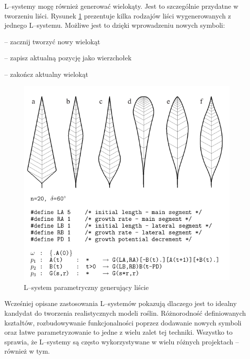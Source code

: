 \documentclass[inz,longabstract]{iithesis}
\begin{document}
        L--systemy mogę również generować wielokąty. Jest to szczególnie przydatne w tworzeniu liści. Rysunek \ref{fig:lsystemLeafs} prezentuje kilka rodzajów liści wygenerowanych z jednego L--systemu. Możliwe jest to dzięki wprowadzeniu nowych symboli:
        \begin{description}[itemsep=2pt, parsep=2pt, topsep=2pt, partopsep=2pt]
            \item[\text{\{}] -- zacznij tworzyć nowy wielokąt 
            \item[.] -- zapisz aktualną pozycję jako wierzchołek
            \item[\text{\}}] -- zakończ aktualny wielokąt
        \end{description}
        \begin{figure}[H]
            \includegraphics[width=\linewidth]{lsystemLeafs.png}
            \caption{L--system parametryczny generujący liście \cite{plants}} 
            \label{fig:lsystemLeafs}
        \end{figure}
        
        Wcześniej opisane zastosowania L--systemów pokazują dlaczego jest to idealny kandydat do tworzenia realistycznych modeli roślin. Różnorodność definiowanych kształtów, rozbudowywanie funkcjonalności poprzez dodawanie nowych symboli oraz łatwe parametryzowanie to jedne z wielu zalet tej techniki. Wszystko to sprawia, że L--systemy są często wykorzystywane w wielu różnych projektach -- również w tym. 
        
\end{document}
